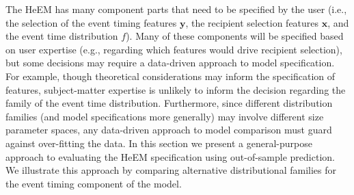 \documentclass[12pt]{article}
\begin{document}
The HeEM has many component parts that need to be specified by the user (i.e., the selection of the event timing features $\bm{y}$, the recipient selection features $\bm{x}$, and the event time distribution $f$). Many of these components will be specified based on user expertise (e.g., regarding which features would drive recipient selection), but some decisions may require a data-driven approach to model specification. For example, though theoretical considerations may inform the specification of features, subject-matter expertise is unlikely to inform the decision regarding the family of the event time distribution. Furthermore, since different distribution families (and model specifications more generally) may involve different size parameter spaces, any data-driven approach to model comparison must guard against over-fitting the data. In this section we present a general-purpose approach to evaluating the HeEM specification using out-of-sample prediction. We illustrate this approach by comparing alternative distributional families for the event timing component of the model.

\end{document}
